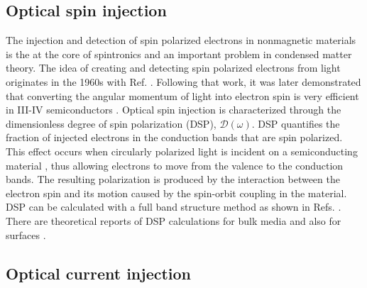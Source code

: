 
\subsection{Optical spin injection}

The injection and detection of spin polarized electrons in nonmagnetic materials
is the at the core of spintronics \cite{vzuticRMP04, fertRMP08} and an important
problem in condensed matter theory. The idea of creating and detecting spin
polarized electrons from light originates in the 1960s with Ref.
\cite{lampelPRL68}. Following that work, it was later demonstrated that
converting the angular momentum of light into electron spin is very efficient in
III-IV semiconductors \cite{dyakonovOO84}. Optical spin injection is
characterized through the dimensionless degree of spin polarization (DSP),
$\boldsymbol{\mathcal{D}}(\omega)$. DSP quantifies the fraction of injected
electrons in the conduction bands that are spin polarized. This effect occurs
when circularly polarized light is incident on a semiconducting material
\cite{dyakonovOO84}, thus allowing electrons to move from the valence to the
conduction bands. The resulting polarization is produced by the interaction
between the electron spin and its motion caused by the spin-orbit coupling in
the material. DSP can be calculated with a full band structure method as shown
in Refs. \cite{nastosPRB07,cabellosPRB09}. There are theoretical reports of DSP
calculations for bulk media \cite{nastosPRB07, cabellosPRB09} and also for
surfaces \cite{mendozaPRB12, arzatePRB14}.



\subsection{Optical current injection}

